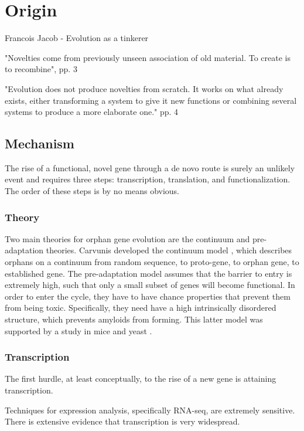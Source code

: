 \section{Origin}

Francois Jacob - Evolution as a tinkerer \cite{jacob_evolution_1977}

"Novelties come from previously unseen association of old material. To create
is to recombine", pp. 3

"Evolution does not produce novelties from scratch. It works on what already
exists, either transforming a system to give it new functions or combining
several systems to produce a more elaborate one." pp. 4

\subsection{Mechanism}

The rise of a functional, novel gene through a de novo route is surely an
unlikely event and requires three steps: transcription, translation, and
functionalization. The order of these steps is by no means obvious.

\subsubsection{Theory}

Two main theories for orphan gene evolution are the continuum and
pre-adaptation theories. Carvunis developed the continuum model
\cite{carvunis_proto-genes_2012}, which describes orphans on a continuum from
random sequence, to proto-gene, to orphan gene, to established gene. The
pre-adaptation model assumes that the barrier to entry is extremely high, such
that only a small subset of genes will become functional. In order to enter the
cycle, they have to have chance properties that prevent them from being toxic.
Specifically, they need have a high intrinsically disordered structure, which
prevents amyloids from forming. This latter model was supported by a study in
mice and yeast \cite{wilson2017young}.

\subsubsection{Transcription}

The first hurdle, at least conceptually, to the rise of a new gene is attaining
transcription.

Techniques for expression analysis, specifically RNA-seq, are extremely
sensitive. There is extensive evidence that transcription is very widespread.

